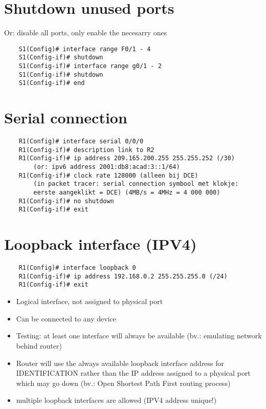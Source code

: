 \documentclass[10pt, a4paper]{article}
\begin{document}
	\section{Shutdown unused ports}
	Or: disable all ports, only enable the necesarry ones\\
	\begin{lstlisting}
	S1(Config)# interface range F0/1 - 4
	S1(Config-if)# shutdown
	S1(Config-if)# interface range g0/1 - 2
	S1(Config-if)# shutdown
	S1(Config-if)# end
	\end{lstlisting}
	
	\section{Serial connection}
	\begin{lstlisting}
	R1(Config)# interface serial 0/0/0
	R1(Config-if)# description link to R2
	R1(Config-if)# ip address 209.165.200.255 255.255.252 (/30)
		(or: ipv6 address 2001:db8:acad:3::1/64)
	R1(Config-if)# clock rate 128000 (alleen bij DCE)
		(in packet tracer: serial connection symbool met klokje: 
		eerste aangeklikt = DCE) (4MB/s = 4MHz = 4 000 000)
	R1(Config-if)# no shutdown
	R1(Config-if)# exit
	\end{lstlisting}
	
	\section{Loopback interface (IPV4)}
	\begin{lstlisting}
	R1(Config)# interface loopback 0
	R1(Config-if)# ip address 192.168.0.2 255.255.255.0 (/24)
	R1(Config-if)# exit
	\end{lstlisting}
	
	\begin{itemize}[noitemsep,nolistsep]
		\item Logical interface, not assigned to physical port
		\item Can be connected to any device
		\item Testing: at least one interface will always be available (bv.: emulating network behind router)
		\item Router will use the always available loopback interface address for IDENTIFICATION rather than the IP address assigned to a physical port which may go down (bv.: Open Shortest Path First routing process)
		\item multiple loopback interfaces are allowed (IPV4 address unique!)\\
	\end{itemize}
	
\end{document}
